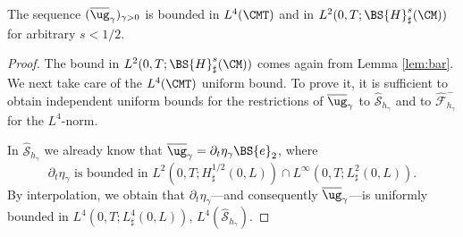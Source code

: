 \begin{lemma}
\label{lem:extension-u}
The sequence $(\overline{\ug}_{\gamma})_{\gamma >0}$ is bounded in $L^{4}(\CMT)$ and in
$L^{2}(0,T;\BS{H}^{s}_{\sharp}(\CM))$ for arbitrary $s<1/2$.
\end{lemma}
\begin{proof}The bound in $L^{2}(0,T;\BS{H}^{s}_{\sharp}(\CM))$ comes again from Lemma \ref{lem:bar}. We next take care of the $L^{4}(\CMT)$ uniform bound.
To prove it, it is sufficient to obtain independent uniform bounds for the restrictions
of $\overline{\ug}_{\gamma}$ to $\widehat{\mathcal S}_{h_{\gamma}}$ and to $\widehat{\mathcal F}^{-}_{h_{\gamma}}$ for the $L^4$-norm.

In $\widehat{\mathcal{S}}_{h_{\gamma}}$ we already know that $\overline{\ug}_{\gamma}=\partial_{t}\eta_{\gamma}\BS{e}_{2}$, where 
\[
\text{$\partial_t{\eta}_{\gamma}$ is bounded in $L^{2}(0,T;H_\sharp^{1/2}(0,L)) \cap L^{\infty}(0,T;L_\sharp^{2}(0,L))$.}
\]
By interpolation, we obtain that $\partial_{t}\eta_{\gamma}$---and consequently \resp $\overline{\ug}_{\gamma}$---is uniformly bounded in $L^{4}(0,T;L_\sharp^{4}(0,L))$, \resp $L^4(\widehat{\mathcal S}_{h_{\gamma}})$.


\end{proof}
